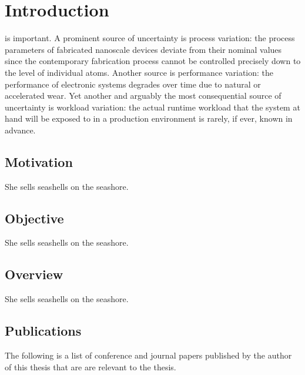 \chapter{Introduction}
 is important. A prominent source of uncertainty is
process variation: the process parameters of fabricated nanoscale devices
deviate from their nominal values since the contemporary fabrication process
cannot be controlled precisely down to the level of individual atoms. Another
source is performance variation: the performance of electronic systems degrades
over time due to natural or accelerated wear. Yet another and arguably the most
consequential source of uncertainty is workload variation: the actual runtime
workload that the system at hand will be exposed to in a production environment
is rarely, if ever, known in advance.

\section{Motivation}
She sells seashells on the seashore.

\section{Objective}
She sells seashells on the seashore.

\section{Overview}
She sells seashells on the seashore.

\section{Publications}
The following is a list of conference and journal papers published by the author
of this thesis that are are relevant to the thesis.

\printbibliography[heading=none,keyword=own]
